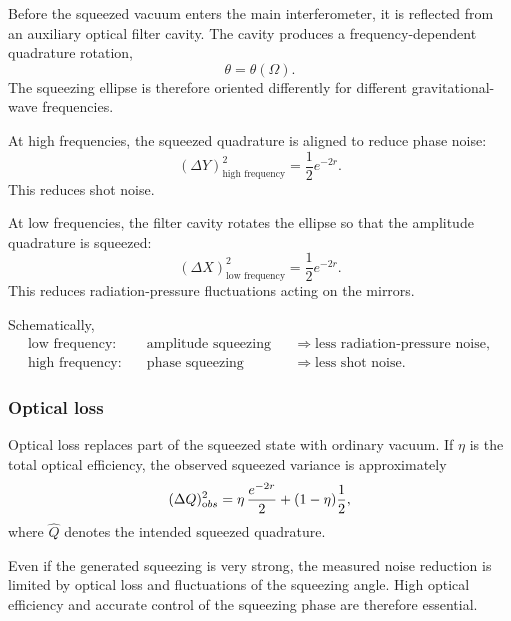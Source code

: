 Before the squeezed vacuum enters the main interferometer, it is reflected
from an auxiliary optical filter cavity. The cavity produces a
frequency-dependent quadrature rotation,
\begin{equation}
    \theta=\theta(\Omega).
\end{equation}
The squeezing ellipse is therefore oriented differently for different
gravitational-wave frequencies.

At high frequencies, the squeezed quadrature is aligned to reduce phase
noise:
\begin{equation}
    (\Delta Y)^2_{\text{high\ frequency}}
    =\frac12e^{-2r}.
\end{equation}
This reduces shot noise.

At low frequencies, the filter cavity rotates the ellipse so that the
amplitude quadrature is squeezed:
\begin{equation}
    (\Delta X)^2_{\text{low\ frequency}}
    =\frac12e^{-2r}.
\end{equation}
This reduces radiation-pressure fluctuations acting on the mirrors.

Schematically,
\begin{equation}
    \boxed{
    \begin{aligned}
        \text{low frequency:}\quad
        &\text{amplitude squeezing}
        &&\Longrightarrow
        \text{less radiation-pressure noise},\\
        \text{high frequency:}\quad
        &\text{phase squeezing}
        &&\Longrightarrow
        \text{less shot noise}.
    \end{aligned}}
\end{equation}

\subsubsection{Optical loss}

Optical loss replaces part of the squeezed state with ordinary vacuum. If
\(\eta\) is the total optical efficiency, the observed squeezed variance is
approximately
\begin{equation}
    (\Delta Q)^2_{\text obs}
    =
    \eta\,\frac{e^{-2r}}{2}
    +(1-\eta)\frac12,
\end{equation}
where \(\hat Q\) denotes the intended squeezed quadrature.

Even if the generated squeezing is very strong, the measured noise reduction
is limited by optical loss and fluctuations of the squeezing angle. High
optical efficiency and accurate control of the squeezing phase are therefore
essential.


